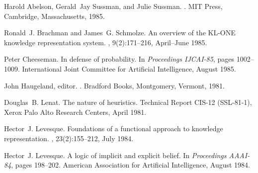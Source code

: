 %
%
\begin{thebibliography}{}

Harold Abelson, Gerald~Jay Sussman, and Julie Sussman.
.
\newblock MIT Press, Cambridge, Massachusetts, 1985.

Ronald~J. Brachman and James~G. Schmolze.
\newblock An overview of the {KL-ONE} knowledge representation system.
, 9(2):171--216, April--June 1985.

Peter Cheeseman.
\newblock In defense of probability.
\newblock In {\em Proceedings IJCAI-85}, pages 1002--1009. International Joint
  Committee for Artificial Intelligence, August 1985.

John Haugeland, editor.
.
\newblock Bradford Books, Montgomery, Vermont, 1981.

Douglas~B. Lenat.
\newblock The nature of heuristics.
\newblock Technical Report CIS-12 (SSL-81-1), Xerox Palo Alto Research Centers,
  April 1981.

Hector~J. Levesque.
\newblock Foundations of a functional approach to knowledge representation.
, 23(2):155--212, July 1984.

Hector~J. Levesque.
\newblock A logic of implicit and explicit belief.
\newblock In {\em Proceedings AAAI-84}, pages 198--202. American Association
  for Artificial Intelligence, August 1984.

\end{thebibliography}




